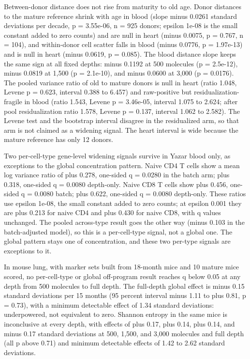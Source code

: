 \documentclass[11pt]{article}
\begin{document}
Between-donor distance does not rise from maturity to old age. Donor distances to the mature reference shrink with age in blood (slope minus 0.0261 standard deviations per decade, p = 3.55e-06, n = 925 donors; epsilon 1e-08 is the small constant added to zero counts) and are null in heart (minus 0.0075, p = 0.767, n = 104), and within-donor cell scatter falls in blood (minus 0.0776, p = 1.97e-13) and is null in heart (minus 0.0619, p = 0.085). The blood distance slope keeps the same sign at all fixed depths: minus 0.1192 at 500 molecules (p = 2.5e-12), minus 0.0819 at 1,500 (p = 2.1e-10), and minus 0.0600 at 3,000 (p = 0.0176). The pooled variance ratio of old to mature donors is null in heart (ratio 1.048, Levene p = 0.623, interval 0.388 to 6.457) and raw-positive but residualization-fragile in blood (ratio 1.543, Levene p = 3.46e-05, interval 1.075 to 2.624; after pool residualization ratio 1.578, Levene p = 0.137, interval 1.062 to 2.582). The Levene test and the bootstrap interval disagree in the residualized arm, so that arm is not claimed as a widening signal. The heart interval is wide because the mature reference has only 12 donors.

Two per-cell-type gene-level widening signals survive in Yazar blood only, as exceptions to the global concentration pattern. Naive CD4 T cells show a mean log variance ratio of plus 0.278, one-sided q = 0.0280 in the batch arm; plus 0.318, one-sided q = 0.0080 depth-only. Naive CD8 T cells show plus 0.456, one-sided q = 0.0080 batch; plus 0.622, one-sided q = 0.0080 depth-only. These ratios use epsilon 1e-08, the small constant added to zero counts; at epsilon 0.001 they are plus 0.213 for naive CD4 and plus 0.430 for naive CD8, with q values unchanged. The pooled across-type result goes the other way (minus 0.103 in the batch-adjusted model), so this is a per-cell-type signal, not a global one. The global pattern stays one of concentration, and these two per-type signals are exceptions to it.

In mouse lung, with marker sets built from 18-month mice and 10 mature mice scored, no per-cell-type or global off-program result reaches q below 0.05 at any depth from 500 molecules to full depth. The full-depth global effect is minus 0.15 standard deviations per 15 months (95 percent interval minus 1.11 to plus 0.81, p = 0.73), with a minimum detectable effect of 1.34 standard deviations: underpowered, not equivalent to zero. Shannon entropy in the same mice is inconclusive at every depth, with effects of plus 0.17, plus 0.14, plus 0.14, and minus 0.17 standard deviations at 500, 1,500, and 3,000 molecules and full depth (all p above 0.71) and minimum detectable effects of 1.42 to 2.62 standard deviations.
\end{document}
